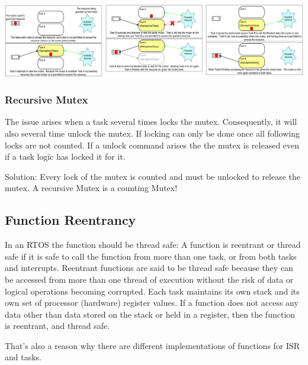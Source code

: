 \includegraphics[width=\textwidth]{images/Concurrency/mutex.png}

\subsubsection{Recursive Mutex}
The issue arises when a task several times locks the mutex.
Consequently, it will also several time unlock the mutex.
If locking can only be done once all following locks are not counted.
If a unlock command arises the the mutex is released even if a task logic has locked it for it.

Solution:
Every lock of the mutex is counted and must be unlocked to release the mutex.
A recursive Mutex is a counting Mutex!


\subsection{Function Reentrancy}
In an RTOS the function should be thread safe:
A function is \glqq{}reentrant\grqq{} or thread safe if it is safe to call the function from more than one task, or from both tasks and interrupts.
Reentrant functions are said to be \glqq{}thread safe\grqq{} because they can be accessed from more than one thread of execution without the risk of data or logical operations becoming corrupted.
Each task maintains its own stack and its own set of processor (hardware) register values.
If a function does not access any data other than data stored on the stack or held in a register, then the function is reentrant, and thread safe.

That's also a reason why there are different implementations of functions for ISR and tasks.

